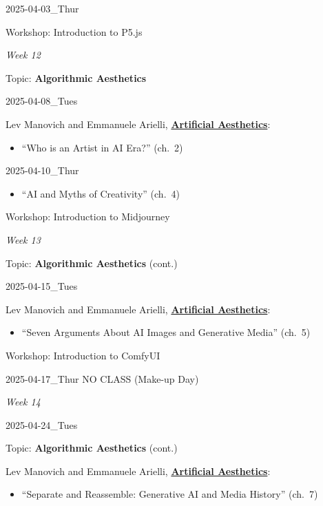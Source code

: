 \documentclass[
  letterpaper,
  DIV=11,
  numbers=noendperiod]{scrartcl}
\providecommand{\tightlist}{%
  \setlength{\itemsep}{0pt}\setlength{\parskip}{0pt}}
\begin{document}
2025-04-03\_Thur

Workshop: Introduction to P5.js

\emph{Week 12}

Topic: \textbf{Algorithmic Aesthetics}

2025-04-08\_Tues

Lev Manovich and Emmanuele Arielli,
\href{https://manovich.net/index.php/projects/artificial-aesthetics}{\textbf{Artificial
Aesthetics}}:

\begin{itemize}
\tightlist
\item
  ``Who is an Artist in AI Era?'' (ch.~2)
\end{itemize}

2025-04-10\_Thur

\begin{itemize}
\tightlist
\item
  ``AI and Myths of Creativity'' (ch.~4)
\end{itemize}

Workshop: Introduction to Midjourney

\emph{Week 13}

Topic: \textbf{Algorithmic Aesthetics} (cont.)

2025-04-15\_Tues

Lev Manovich and Emmanuele Arielli,
\href{https://manovich.net/index.php/projects/artificial-aesthetics}{\textbf{Artificial
Aesthetics}}:

\begin{itemize}
\tightlist
\item
  ``Seven Arguments About AI Images and Generative Media'' (ch.~5)
\end{itemize}

Workshop: Introduction to ComfyUI

2025-04-17\_Thur NO CLASS (Make-up Day)

\emph{Week 14}

2025-04-24\_Tues

Topic: \textbf{Algorithmic Aesthetics} (cont.)

Lev Manovich and Emmanuele Arielli,
\href{https://manovich.net/index.php/projects/artificial-aesthetics}{\textbf{Artificial
Aesthetics}}:

\begin{itemize}
\tightlist
\item
  ``Separate and Reassemble: Generative AI and Media History'' (ch.~7)
\end{itemize}
\end{document}
